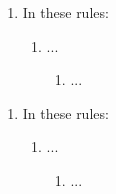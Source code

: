 
\begin{enumerate}
    \item In these rules:
    \begin{enumerate}
        \item ...
        \begin{enumerate}
            \item ...
        \end{enumerate}
    \end{enumerate}    
\end{enumerate}

\begin{enumerate}
    \item In these rules:
    \begin{enumerate}
        \item ...
        \begin{enumerate}
            \item ...
        \end{enumerate}
    \end{enumerate}    
\end{enumerate}

